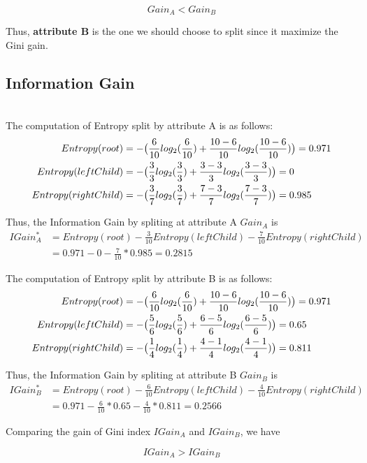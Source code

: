 \documentclass[11pt,a4paper]{article}
\begin{document}
 $$
        Gain_A < Gain_B
 $$

 Thus, \textbf{attribute B} is the one we should choose to split since it maximize the
Gini gain.

\newpage
\subsection{Information Gain}
\\

The computation of Entropy split by attribute A is as follows:
\begin{align*}
    Entropy(root) &= -\big( \frac{6}{10} log_2(\frac{6}{10}) + \frac{10-6}{10} log_2(\frac{10-6}{10})\big) = 0.971 \\
    Entropy(leftChild) &= -\big( \frac{3}{3} log_2(\frac{3}{3}) + \frac{3-3}{3} log_2(\frac{3-3}{3})\big) = 0 \\
    Entropy(rightChild) &= -\big( \frac{3}{7} log_2(\frac{3}{7}) + \frac{7-3}{7} log_2(\frac{7-3}{7})\big) = 0.985 
 \end{align*}

 Thus, the Information Gain by spliting at attribute A $Gain_A$ is 
\begin{align*}
    IGain_A^* &=  Entropy(root)- \frac{3}{10}Entropy(leftChild) - \frac{7}{10} Entropy(rightChild) \\
        &= 0.971 - 0 - \frac{7}{10} * 0.985 = 0.2815
 \end{align*}

The computation of Entropy split by attribute B is as follows:
\begin{align*}
    Entropy(root) &= -\big( \frac{6}{10} log_2(\frac{6}{10}) + \frac{10-6}{10} log_2(\frac{10-6}{10})\big) = 0.971 \\
    Entropy(leftChild) &= -\big( \frac{5}{6} log_2(\frac{5}{6}) + \frac{6-5}{6} log_2(\frac{6-5}{6})\big) = 0.65 \\
    Entropy(rightChild) &= -\big( \frac{1}{4} log_2(\frac{1}{4}) + \frac{4-1}{4} log_2(\frac{4-1}{4})\big) = 0.811 
 \end{align*}

 Thus, the Information Gain by spliting at attribute B $Gain_B$ is 
\begin{align*}
    IGain_B^{*} &= Entropy(root) - \frac{6}{10} Entropy(leftChild) -
    \frac{4}{10}Entropy(rightChild) \\
    &= 0.971 - \frac{6}{10} * 0.65 - \frac{4}{10} * 0.811 = 0.2566 
 \end{align*}

 Comparing the gain of Gini index $IGain_A$ and $IGain_B$, we have

 $$
    IGain_A > IGain_B
 $$
\end{document}
